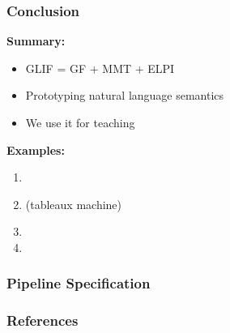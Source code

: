 \documentclass[aspectratio=169]{beamer}
\begin{document}




% 


% 




\begin{frame}
    \frametitle{Conclusion}
    \begin{minipage}[t]{0.5\textwidth}
        \textbf{Summary:}
        \begin{itemize}
            \item GLIF = GF + MMT + ELPI
            \item Prototyping natural language semantics%
            \item We use it for teaching
        \end{itemize}
    \end{minipage}
    \begin{minipage}[t]{0.49\textwidth}
        \textbf{Examples:}
        \begin{enumerate}
            \item {}
            \item {} (tableaux machine)
            \item {}
            \item {}
        \end{enumerate}
    \end{minipage}
    
    \vspace{1em}
    \centering
    
\end{frame}

\appendix

\begin{frame}
    \frametitle{Pipeline Specification}
    
\end{frame}



\begin{frame}[allowframebreaks,t]
    \frametitle{References}
    \printbibliography
\end{frame}
\end{document}
